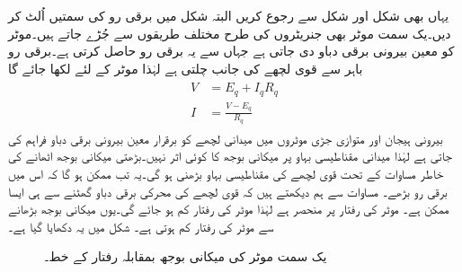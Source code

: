 یہاں بھی شکل   اور شکل   سے رجوع کریں البتہ شکل میں برقی رو کی سمتیں اُلٹ کر دیں۔یک سمت  موٹر بھی جنریٹروں کی طرح مختلف طریقوں سے جُڑے جاتے ہیں۔موٹر کو معین بیرونی برقی دباو دی جاتی ہے جہاں سے یہ برقی رو حاصل کرتی ہے۔برقی رو باہر سے قوی لچھے کی جانب چلتی ہے لہٰذا موٹر کے لئے لکھا جائے گا
\begin{gather}
\begin{aligned}\label{مساوات_یکسمتی_دباو_رو_قوی_سلسلہ_وار}
V&=E_q+I_q R_q\\
I&=\frac{V-E_q}{R_q}
\end{aligned}
\end{gather}
بیرونی ہیجان اور متوازی جڑی موٹروں میں میدانی لچھے کو برقرار معین بیرونی برقی دباو فراہم کی جاتی ہے لہٰذا میدانی مقناطیسی بہاو پر میکانی بوجھ کا کوئی اثر نہیں۔بڑھتی میکانی بوجھ اٹھانے کی خاطر مساوات    کے تحت قوی لچھے کی مقناطیسی بہاو بڑھنی ہو گی۔یہ تب ممکن ہو گا کہ اس میں برقی رو بڑھے۔ مساوات  سے ہم دیکھتے ہیں کہ قوی لچھے کی محرکی برقی دباو   گھٹنے سے ہی ایسا ممکن ہے۔ موٹر کی رفتار پر منحصر ہے لہٰذا موٹر کی رفتار کم ہو جائے گی۔یوں میکانی بوجھ بڑھانے سے موٹر کی رفتار کم ہوتی ہے۔ شکل    میں یہ دکھایا گیا ہے۔
\begin{figure}
\centering
\newcommand\DrawControl[3]{
  node[#2,circle,fill=#2,inner sep=2pt,label={above:$#1$},label={[black]below:{\footnotesize#3}}] at #1 {}
}
%
\caption{یک سمت  موٹر کی میکانی بوجھ بمقابلہ رفتار کے خط۔}
\label{شکل_یکسمتی_موٹر_رفتار_بالمقابل_بار}
\end{figure}

